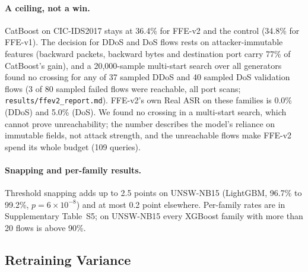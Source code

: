 \paragraph{A ceiling, not a win.} CatBoost on CIC-IDS2017 stays at 36.4\% for FFE-v2 and the control (34.8\% for FFE-v1). The decision for DDoS and DoS flows rests on attacker-immutable features (backward packets, backward bytes and destination port carry 77\% of CatBoost's gain), and a 20,000-sample multi-start search over all generators found no crossing for any of 37 sampled DDoS and 40 sampled DoS validation flows (3 of 80 sampled failed flows were reachable, all port scans; \texttt{results/ffev2\_report.md}). FFE-v2's own Real ASR on these families is 0.0\% (DDoS) and 5.0\% (DoS). We found no crossing in a multi-start search, which cannot prove unreachability; the number describes the model's reliance on immutable fields, not attack strength, and the unreachable flows make FFE-v2 spend its whole budget (109 queries).

\paragraph{Snapping and per-family results.} Threshold snapping adds up to 2.5 points on UNSW-NB15 (LightGBM, 96.7\% to 99.2\%, $p=6\times10^{-8}$) and at most 0.2 point elsewhere. Per-family rates are in Supplementary Table~S5; on UNSW-NB15 every XGBoost family with more than 20 flows is above 90\%.

\subsection{Retraining Variance}
\label{sec:seeds}

\begin{table}[!htbp]
\caption{Real ASR (\%, mean $\pm$ standard deviation over seeds) of the frozen attacks; each seed retrains the target and draws a new cohort of up to 300 detected flows. Five seeds for XGBoost, three for LightGBM and CatBoost. $q$: mean queries of FFE-v2.}\label{tab:seeds}
\centering
\linespread{1}\selectfont
\resizebox{\textwidth}{!}{%
%
}
\end{table}

